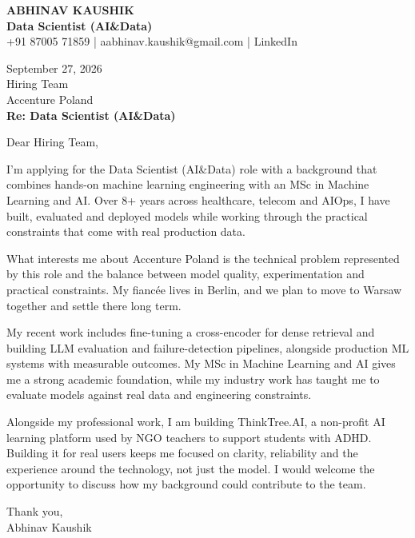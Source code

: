 \documentclass[10pt,a4paper]{article}
\begin{document}
\begin{center}
{\Large\bfseries ABHINAV KAUSHIK}\\[2pt]
{\bfseries Data Scientist (AI\&Data)}\\[2pt]
+91 87005 71859 \quad | \quad aabhinav.kaushik@gmail.com \quad | \quad LinkedIn
\end{center}
\vspace{8pt}
September 27, 2026\\[6pt]
Hiring Team\\
Accenture Poland\\[4pt]
\textbf{Re: Data Scientist (AI\&Data)}

Dear Hiring Team,

I’m applying for the Data Scientist (AI\&Data) role with a background that combines hands-on machine learning engineering with an MSc in Machine Learning and AI. Over 8+ years across healthcare, telecom and AIOps, I have built, evaluated and deployed models while working through the practical constraints that come with real production data.

What interests me about Accenture Poland is the technical problem represented by this role and the balance between model quality, experimentation and practical constraints. My fiancée lives in Berlin, and we plan to move to Warsaw together and settle there long term.

My recent work includes fine-tuning a cross-encoder for dense retrieval and building LLM evaluation and failure-detection pipelines, alongside production ML systems with measurable outcomes. My MSc in Machine Learning and AI gives me a strong academic foundation, while my industry work has taught me to evaluate models against real data and engineering constraints.

Alongside my professional work, I am building ThinkTree.AI, a non-profit AI learning platform used by NGO teachers to support students with ADHD. Building it for real users keeps me focused on clarity, reliability and the experience around the technology, not just the model. I would welcome the opportunity to discuss how my background could contribute to the team.

Thank you,\\
Abhinav Kaushik
\end{document}
